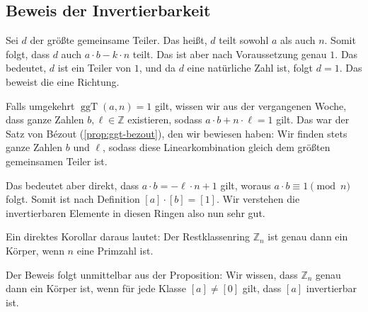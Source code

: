 \subsection{Beweis der Invertierbarkeit}

\begin{spoken-clean}[00:27:46 - 00:29:06]
Sei $d$ der größte gemeinsame Teiler. Das heißt, $d$ teilt sowohl $a$ als auch $n$. Somit folgt, dass $d$ auch $a \cdot b - k \cdot n$ teilt. Das ist aber nach Voraussetzung genau $1$. Das bedeutet, $d$ ist ein Teiler von $1$, und da $d$ eine natürliche Zahl ist, folgt $d = 1$. Das beweist die eine Richtung.

Falls umgekehrt $\operatorname{ggT}(a, n) = 1$ gilt, wissen wir aus der vergangenen Woche, dass ganze Zahlen $b, \ell \in \mathbb{Z}$ existieren, sodass $a \cdot b + n \cdot \ell = 1$ gilt. Das war der Satz von Bézout (\cref{prop:ggt-bezout}), den wir bewiesen haben: Wir finden stets ganze Zahlen $b$ und $\ell$, sodass diese Linearkombination gleich dem größten gemeinsamen Teiler ist.
\end{spoken-clean}

\begin{spoken-clean}[00:29:06 - 00:30:56]
Das bedeutet aber direkt, dass $a \cdot b = -\ell \cdot n + 1$ gilt, woraus $a \cdot b \equiv 1 \pmod n$ folgt. Somit ist nach Definition $[a] \cdot [b] = [1]$. Wir verstehen die invertierbaren Elemente in diesen Ringen also nun sehr gut.

Ein direktes Korollar daraus lautet: Der Restklassenring $\mathbb{Z}_n$ ist genau dann ein Körper, wenn $n$ eine Primzahl ist.

Der Beweis folgt unmittelbar aus der Proposition: Wir wissen, dass $\mathbb{Z}_n$ genau dann ein Körper ist, wenn für jede Klasse $[a] \neq [0]$ gilt, dass $[a]$ invertierbar ist.
\end{spoken-clean}

